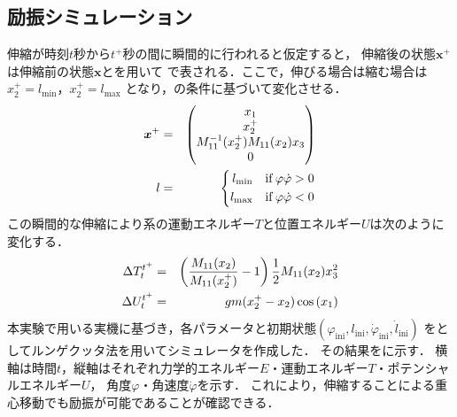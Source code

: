           \subsection{励振シミュレーション}
          伸縮が時刻$t$秒から$t^{+}$秒の間に瞬間的に行われると仮定すると，
          伸縮後の状態$\bm{x}^{+}$は伸縮前の状態$\bm{x}$とを用いて
          で表される．ここで，伸びる場合は縮む場合は$x_2^{+}=l_{\mathrm{min}}$，$x_2^{+}=l_{\mathrm{max}}$
          となり，の条件に基づいて変化させる．
          \begin{eqnarray}
            \equlabel{xx}
            \bm{x}^{+}&=&
            \begin{pmatrix}
                x_1\\
                x_2^{+}\\
                M_{11}^{-1}(x_2^{+})M_{11}(x_2)x_3\\
                0\\
                \end{pmatrix}\\
            \equlabel{l_change}
           l&=& \left\{
              \begin{aligned}
                l_{\mathrm{min}}\quad \mathrm{if}\,\varphi\dot{\varphi}>0\\
                l_{\mathrm{max}}\quad \mathrm{if}\,\varphi\dot{\varphi}<0
              \end{aligned}
            \right.
            \end{eqnarray}
          この瞬間的な伸縮により系の運動エネルギー$T$と位置エネルギー$U$は次のように変化する．
          \begin{eqnarray}
            \equlabel{dT}
            \Delta T_t^{t^{+}}&=&\left(\frac{M_{11}(x_2)}{M_{11}(x_2^{+})}-1\right)\frac{1}{2}M_{11}(x_2)x_3^2\\
            \equlabel{dU}
            \Delta U_t^{t^{+}}&=&gm(x_2^{+}-x_2)\cos{(x_1)}            
            \end{eqnarray}
          本実験で用いる実機に基づき，各パラメータと初期状態$(\varphi_{\mathrm{ini}},l_{\mathrm{ini}},\dot{\varphi}_{\mathrm{ini}},\dot{l}_{\mathrm{ini}})$
          をとしてルンゲクッタ法を用いてシミュレータを作成した．
          その結果をに示す．
          横軸は時間$t$，縦軸はそれぞれ力学的エネルギー$E$・運動エネルギー$T$・ポテンシャルエネルギー$U$，
          角度$\varphi$・角速度$\dot{\varphi}$を示す．
          これにより，伸縮することによる重心移動でも励振が可能であることが確認できる．
